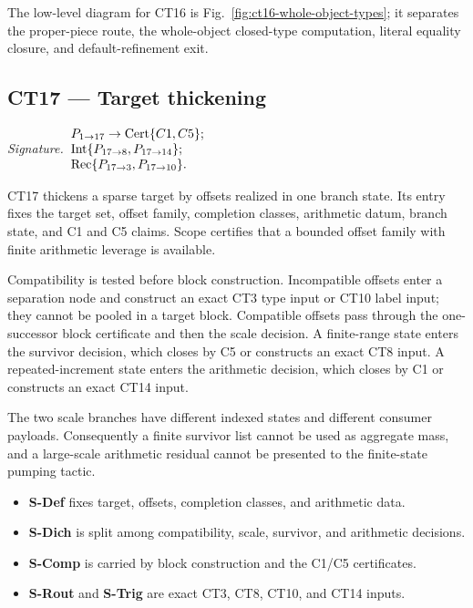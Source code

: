 \documentclass[
  11pt,
]{article}
\providecommand{\tightlist}{%
  \setlength{\itemsep}{0pt}\setlength{\parskip}{0pt}}
\theoremstyle{definition}
\newcommand{\ctsignature}[1]{\par\noindent\emph{Signature.}\ #1\par\medskip}
\newcommand{\ctcert}[1]{\mathrm{Cert}\{#1\}}
\newcommand{\ctint}[1]{\mathrm{Int}\{#1\}}
\newcommand{\ctrec}[1]{\mathrm{Rec}\{#1\}}
\begin{document}
The low-level diagram for CT16 is Fig.~\ref{fig:ct16-whole-object-types};
it separates the proper-piece route, the whole-object closed-type
computation, literal equality closure, and default-refinement exit.



\subsection{CT17 --- Target thickening}\label{ct:17}\label{target-thickening-bounded-offsets-against-sparse-targets}
\ctsignature{\(\begin{array}{@{}l@{}}P_{1\to17}\to \ctcert{C1,C5};\\
\ctint{P_{17\to8},P_{17\to14}};\\
\ctrec{P_{17\to3},P_{17\to10}}.\end{array}\)}

CT17 thickens a sparse target by offsets realized in one branch state.  Its
entry fixes the target set, offset family, completion classes, arithmetic
datum, branch state, and C1 and C5 claims.  Scope certifies that a bounded
offset family with finite arithmetic leverage is available.

Compatibility is tested before block construction.  Incompatible offsets
enter a separation node and construct an exact CT3 type input or CT10 label
input; they cannot be pooled in a target block.  Compatible offsets pass
through the one-successor block certificate and then the scale decision.  A
finite-range state enters the survivor decision, which closes by C5 or
constructs an exact CT8 input.  A repeated-increment state enters the
arithmetic decision, which closes by C1 or constructs an exact CT14 input.

The two scale branches have different indexed states and different consumer
payloads.  Consequently a finite survivor list cannot be used as aggregate
mass, and a large-scale arithmetic residual cannot be presented to the
finite-state pumping tactic.

\begin{itemize}
\tightlist
\item \textbf{S-Def} fixes target, offsets, completion classes, and arithmetic data.
\item \textbf{S-Dich} is split among compatibility, scale, survivor, and arithmetic decisions.
\item \textbf{S-Comp} is carried by block construction and the C1/C5 certificates.
\item \textbf{S-Rout} and \textbf{S-Trig} are exact CT3, CT8, CT10, and CT14 inputs.
\end{itemize}
\end{document}
